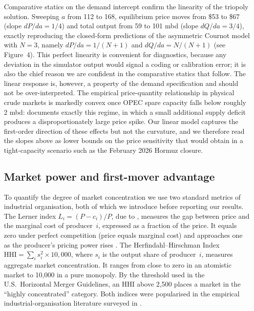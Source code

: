Comparative statics on the demand intercept confirm the linearity of the
triopoly solution. Sweeping $a$ from 112 to 168, equilibrium price moves
from \$53 to \$67 (slope $dP/da = 1/4$) and total output from 59 to 101
mbd (slope $dQ/da = 3/4$), exactly reproducing the closed-form
predictions of the asymmetric Cournot model with $N = 3$, namely
$dP/da = 1/(N+1)$ and $dQ/da = N/(N+1)$ (see Figure~4). This perfect
linearity is convenient for diagnostics, because any deviation in the
simulator output would signal a coding or calibration error; it is also
the chief reason we are confident in the comparative statics that
follow. The linear response is, however, a property of the demand
specification and should not be over-interpreted. The empirical
price-quantity relationship in physical crude markets is markedly
convex once OPEC spare capacity falls below roughly 2 mbd:
\citet{till2016} documents exactly this regime, in which a small
additional supply deficit produces a disproportionately large price
spike. Our linear model captures the first-order direction of these
effects but not the curvature, and we therefore read the slopes above
as lower bounds on the price sensitivity that would obtain in a
tight-capacity scenario such as the February 2026 Hormuz closure.

\subsection{Market power and first-mover advantage}
\label{subsec:marketpower}

To quantify the degree of market concentration we use two standard
metrics of industrial organisation, both of which we introduce before
reporting our results. The Lerner index $L_i = (P - c_i)/P$, due to
\citet{lerner1934}, measures the gap between price and the marginal cost
of producer~$i$, expressed as a fraction of the price. It equals zero
under perfect competition (price equals marginal cost) and approaches
one as the producer's pricing power rises \citep{bresnahan1989}. The
Herfindahl--Hirschman Index $\mathrm{HHI} = \sum_i s_i^2 \times 10{,}000$,
where $s_i$ is the output share of producer~$i$, measures aggregate
market concentration. It ranges from close to zero in an atomistic
market to 10,000 in a pure monopoly. By the threshold used in the U.S.\
Horizontal Merger Guidelines, an HHI above 2,500 places a market in the
``highly concentrated'' category. Both indices were popularised in the
empirical industrial-organisation literature surveyed in
\citet{bresnahan1989}.

